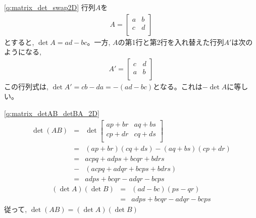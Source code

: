 %
\ref{q:matrix_det_swap2D}  行列$A$を
\begin{eqnarray*}A=\begin{bmatrix}
a & b \\
c & d \\
\end{bmatrix}\end{eqnarray*}
とすると, $\det A=ad-bc$。一方, $A$の第1行と第2行を入れ替えた行列$A'$は次のようになる, 
\begin{eqnarray*}A'=\begin{bmatrix}
c & d \\
a & b \\
\end{bmatrix}\end{eqnarray*}
この行列式は, $\det A'=cb-da=-(ad-bc)$となる。これは$-\det A$に等しい。
\mv

%
\ref{q:matrix_detAB_detBA_2D}
\begin{eqnarray*}
\det (AB)&=&
\det
\begin{bmatrix}
ap+br & aq+bs \\
cp+dr & cq+ds \\
\end{bmatrix}
\\
&=&(ap+br)(cq+ds)-(aq+bs)(cp+dr)\\
&=&acpq+adps+bcqr+bdrs\\
&-&(acpq+adqr+bcps+bdrs)\\
&=&adps+bcqr-adqr-bcps
\end{eqnarray*}
\begin{eqnarray*}
(\det A)(\det B)&=&(ad-bc)(ps-qr)\\
&=&adps+bcqr-adqr-bcps
\end{eqnarray*}
従って, $\det (AB)=(\det A)(\det B)$
\mv

